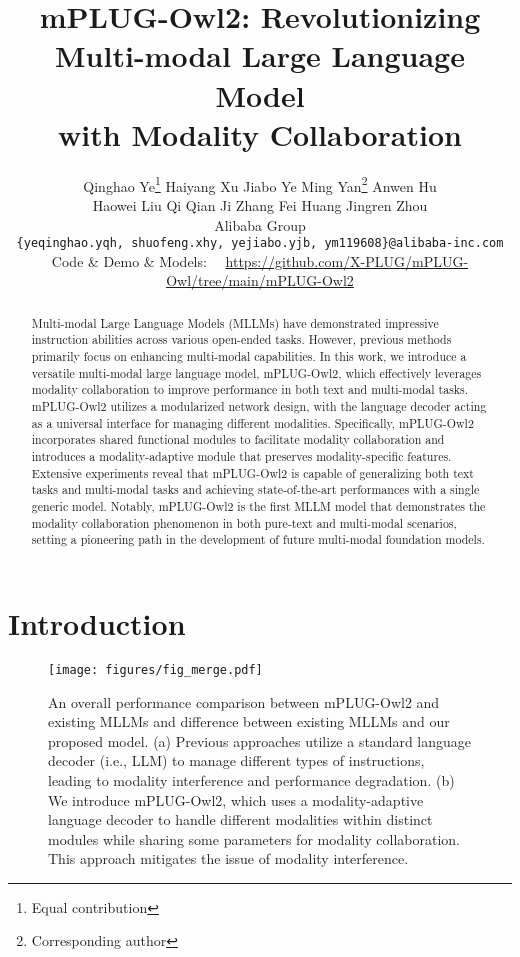 \documentclass[10pt,twocolumn,letterpaper]{article}
\title{mPLUG-Owl2: Revolutionizing Multi-modal Large Language Model \\ with Modality Collaboration}
\author{
Qinghao Ye\thanks{Equal contribution}\hspace{6mm} Haiyang Xu\footnotemark[1]\hspace{6mm} Jiabo Ye\footnotemark[1]\hspace{6mm} Ming Yan\thanks{Corresponding author}\hspace{6mm} Anwen Hu \\ Haowei Liu\hspace{6mm} Qi Qian\hspace{6mm} Ji Zhang\hspace{6mm} Fei Huang\hspace{6mm} Jingren Zhou\\
Alibaba Group \\
{\tt\small \{yeqinghao.yqh, shuofeng.xhy, yejiabo.yjb, ym119608\}@alibaba-inc.com} \\
{\small Code \& Demo \& Models: \ \ \url{https://github.com/X-PLUG/mPLUG-Owl/tree/main/mPLUG-Owl2}}
}
\newcommand{\modelname}{mPLUG-Owl2\xspace}
\begin{document}
\maketitle
\begin{abstract}
Multi-modal Large Language Models (MLLMs) have demonstrated impressive instruction abilities across various open-ended tasks. However, previous methods primarily focus on enhancing multi-modal capabilities. In this work, we introduce a versatile multi-modal large language model, \modelname, which effectively leverages modality collaboration to improve performance in both text and multi-modal tasks. \modelname utilizes a modularized network design, with the language decoder acting as a universal interface for managing different modalities. Specifically, \modelname incorporates shared functional modules to facilitate modality collaboration and introduces a modality-adaptive module that preserves modality-specific features. Extensive experiments reveal that \modelname is capable of generalizing both text tasks and multi-modal tasks and achieving state-of-the-art performances with a single generic model. Notably, \modelname is the first MLLM model that demonstrates the modality collaboration phenomenon in both pure-text and multi-modal scenarios, setting a pioneering path in the development of future multi-modal foundation models.
\end{abstract}

\section{Introduction}


\begin{figure}[h]
    \centering
     \vspace{-2ex}
    \texttt{[image: figures/fig\_merge.pdf]}
    \caption{An overall performance comparison between \modelname and existing MLLMs and difference between existing MLLMs and our proposed model. (a) Previous approaches utilize a standard language decoder (i.e., LLM) to manage different types of instructions, leading to modality interference and performance degradation. (b) We introduce \modelname, which uses a modality-adaptive language decoder to handle different modalities within distinct modules while sharing some parameters for modality collaboration. This approach mitigates the issue of modality interference.}
    \vspace{-2ex}
    \label{fig:modality-colab}
\end{figure}
\end{document}
